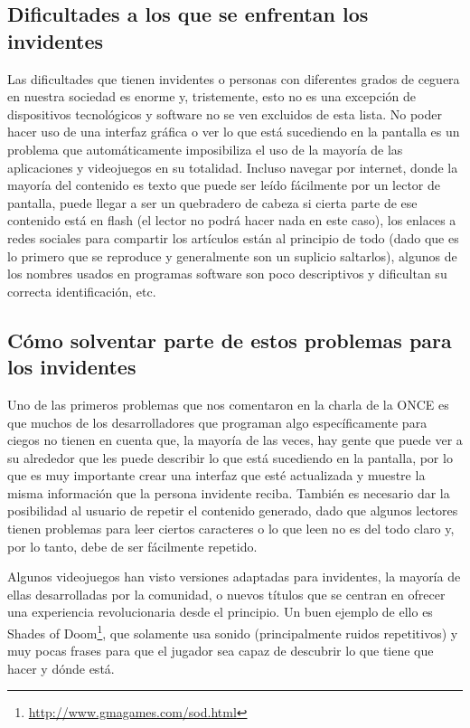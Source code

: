 \subsection{Dificultades a los que se enfrentan los invidentes}

Las dificultades que tienen invidentes o personas con diferentes grados de ceguera en nuestra sociedad es enorme y, tristemente, esto no es una excepción de dispositivos tecnológicos y software no se ven excluidos de esta lista. 
No poder hacer uso de una interfaz gráfica o ver lo que está sucediendo en la pantalla es un problema que automáticamente imposibiliza el uso de la mayoría de las aplicaciones y videojuegos en su totalidad. Incluso navegar por internet, donde la mayoría del contenido es texto que puede ser leído fácilmente por un lector de pantalla, puede llegar a ser un quebradero de cabeza si cierta parte de ese contenido está en flash (el lector no podrá hacer nada en este caso), los enlaces a redes sociales para compartir los artículos están al principio de todo (dado que es lo primero que se reproduce y generalmente son un suplicio saltarlos), algunos de los nombres usados en programas software son poco descriptivos y dificultan su correcta identificación, etc.

\subsection{Cómo solventar parte de estos problemas para los invidentes}

Uno de las primeros problemas que nos comentaron en la charla de la ONCE es que muchos de los desarrolladores que programan algo específicamente para ciegos no tienen en cuenta que, la mayoría de las veces, hay gente que puede ver a su alrededor que les puede describir lo que está sucediendo en la pantalla, por lo que es muy importante crear una interfaz que esté actualizada y muestre la misma información que la persona invidente reciba.
También es necesario dar la posibilidad al usuario de repetir el contenido generado, dado que algunos lectores tienen problemas para leer ciertos caracteres o lo que leen no es del todo claro y, por lo tanto, debe de ser fácilmente repetido.

Algunos videojuegos han visto versiones adaptadas para invidentes, la mayoría de ellas desarrolladas por la comunidad, o nuevos títulos que se centran en ofrecer una experiencia revolucionaria desde el principio. Un buen ejemplo de ello es Shades of Doom\footnote{\url{http://www.gmagames.com/sod.html}}, que solamente usa sonido (principalmente ruidos repetitivos) y muy pocas frases para que el jugador sea capaz de descubrir lo que tiene que hacer y dónde está.

